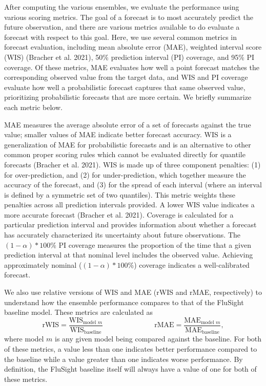 \documentclass[
]{article}
\begin{document}
After computing the various ensembles, we evaluate the performance using
various scoring metrics. The goal of a forecast is to most accurately
predict the future observation, and there are various metrics available
to do evaluate a forecast with respect to this goal. Here, we use
several common metrics in forecast evaluation, including mean absolute
error (MAE), weighted interval score (WIS) (Bracher et al. 2021), 50\%
prediction interval (PI) coverage, and 95\% PI coverage. Of these
metrics, MAE evaluates how well a point forecast matches the
corresponding observed value from the target data, and WIS and PI
coverage evaluate how well a probabilistic forecast captures that same
observed value, prioritizing probabilistic forecasts that are more
certain. We briefly summarize each metric below.

MAE measures the average absolute error of a set of forecasts against
the true value; smaller values of MAE indicate better forecast accuracy.
WIS is a generalization of MAE for probabilistic forecasts and is an
alternative to other common proper scoring rules which cannot be
evaluated directly for quantile forecasts (Bracher et al. 2021). WIS is
made up of three component penalties: (1) for over-prediction, and (2)
for under-prediction, which together measure the accuracy of the
forecast, and (3) for the spread of each interval (where an interval is
defined by a symmetric set of two quantiles). This metric weights these
penalties across all prediction intervals provided. A lower WIS value
indicates a more accurate forecast (Bracher et al. 2021). Coverage is
calculated for a particular prediction interval and provides information
about whether a forecast has accurately characterized its uncertainty
about future observations. The \((1-\alpha)*100\)\% PI coverage measures
the proportion of the time that a given prediction interval at that
nominal level includes the observed value. Achieving approximately
nominal (\((1-\alpha)*100\)\%) coverage indicates a well-calibrated
forecast.

We also use relative versions of WIS and MAE (rWIS and rMAE,
respectively) to understand how the ensemble performance compares to
that of the FluSight baseline model. These metrics are calculated as
\[\textrm{rWIS} = \frac{\textrm{WIS}_{\textrm{model }m}}{\textrm{WIS}_{\textrm{baseline}}} \hspace{3cm} \textrm{rMAE} = \frac{\textrm{MAE}_{\textrm{model }m}}{\textrm{MAE}_{\textrm{baseline}}},\]
where model \(m\) is any given model being compared against the
baseline. For both of these metrics, a value less than one indicates
better performance compared to the baseline while a value greater than
one indicates worse performance. By definition, the FluSight baseline
itself will always have a value of one for both of these metrics.
\end{document}

